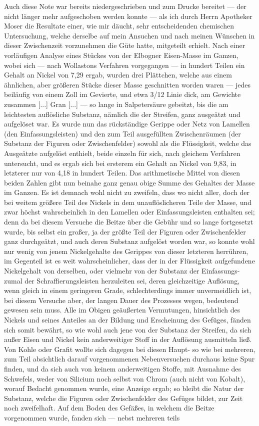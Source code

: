 \documentclass[a4paper, 11pt, oneside, german]{article}
\begin{document}
{Auch diese Note war bereits niedergeschrieben und zum Drucke bereitet --- der nicht länger mehr aufgeschoben werden konnte --- als ich durch Herrn Apotheker Moser die Resultate einer, wie mir däucht, sehr entscheidenden chemischen Untersuchung, welche derselbe auf mein Ansuchen und nach meinen Wünschen in dieser Zwischenzeit vorzunehmen die Güte hatte, mitgeteilt erhielt. Nach einer vorläufigen Analyse eines Stückes von der Elbogner Eisen-Masse im Ganzen, wobei sich --- nach Wollastons Verfahren vorgegangen --- in hundert Teilen ein Gehalt an Nickel von 7,29 ergab, wurden drei Plättchen, welche aus einem ähnlichen, aber größeren Stücke dieser Masse geschnitten worden waren --- jedes beiläufig von einem Zoll im Gevierte, und etwa 3/12 Linie dick, am Gewichte zusammen [...] Gran [...] --- so lange in Salpetersäure gebeitzt, bis die am leichtesten auflösliche Substanz, nämlich die der Streifen, ganz ausgeätzt und aufgelöset war. Es wurde nun das rückständige Gerippe oder Netz von Lamellen (den Einfassungsleisten) und den zum Teil ausgefüllten Zwischenräumen (der Substanz der Figuren oder Zwischenfelder) sowohl als die Flüssigkeit, welche das Ausgeätzte aufgelöst enthielt, beide einzeln für sich, nach gleichem Verfahren untersucht, und es ergab sich bei ersterem ein Gehalt an Nickel von 9,83, in letzterer nur von 4,18 in hundert Teilen. Das arithmetische Mittel von diesen beiden Zahlen gibt nun beinahe ganz genau obige Summe des Gehaltes der Masse im Ganzen. Es ist demnach wohl nicht zu zweifeln, dass wo nicht aller, doch der bei weitem größere Teil des Nickels in dem unauflöslicheren Teile der Masse, und zwar höchst wahrscheinlich in den Lamellen oder Einfassungsleisten enthalten sei; denn da bei diesem Versuche die Beitze über die Gebühr und so lange fortgesetzt wurde, bis selbst ein großer, ja der größte Teil der Figuren oder Zwischenfelder ganz durchgeätzt, und auch deren Substanz aufgelöst worden war, so konnte wohl nur wenig von jenem Nickelgehalte des Gerippes von dieser letzteren herrühren, im Gegenteil ist es weit wahrscheinlicher, dass der in der Flüssigkeit aufgefundene Nickelgehalt von derselben, oder vielmehr von der Substanz der Einfassungs- zumal der Schraffierungsleisten herzuleiten sei, deren gleichzeitige Auflösung, wenn gleich in einem geringeren Grade, schlechterdings immer unvermeidlich ist, bei diesem Versuche aber, der langen Dauer des Prozesses wegen, bedeutend gewesen sein muss. Alle im Obigen geäußerten Vermutungen, hinsichtlich des Nickels und seines Anteiles an der Bildung und Erscheinung des Gefüges, fänden sich somit bewährt, so wie wohl auch jene von der Substanz der Streifen, da sich außer Eisen und Nickel kein anderweitiger Stoff in der Auflösung ausmitteln ließ. Von Kohle oder Grafit wollte sich dagegen bei diesen Haupt- so wie bei mehreren, zum Teil absichtlich darauf vorgenommenen Nebenversuchen durchaus keine Spur finden, und da sich auch von keinem anderweitigen Stoffe, mit Ausnahme des Schwefels, weder von Silicium noch selbst von Chrom (auch nicht von Kobalt), worauf Bedacht genommen wurde, eine Anzeige ergab; so bleibt die Natur der Substanz, welche die Figuren oder Zwischenfelder des Gefüges bildet, zur Zeit noch zweifelhaft. Auf dem Boden des Gefäßes, in welchem die Beitze vorgenommen wurde, fanden sich --- nebst mehreren teils }
\end{document}
